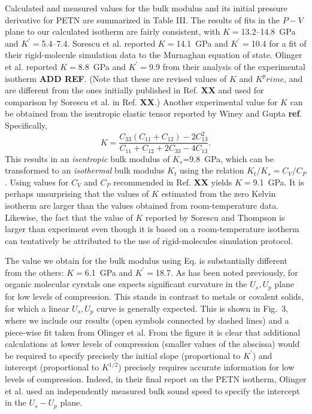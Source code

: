 \documentclass[prb,aps,nobibnotes,twocolumn,doublespace,twocolumngrid,superbib]{revtex4}
\begin{document}
Calculated and measured values for the bulk modulus and its initial
pressure derivative for PETN are summarized in Table III.  The results
of fits in the $P-V$ plane to our calculated isotherm are fairly 
consistent, with $K=$13.2--14.8~GPa and $K^\prime=$5.4--7.4.  Sorescu
et al. reported $K=$14.1~GPa and $K^\prime=$10.4 for a fit of their
rigid-molecule simulation data to the Murnaghan equation of state. 
Olinger et al. reported $K=$8.8~GPa and $K^\prime=$9.9 from their
analysis of the experimental isotherm {\bf ADD REF}.  (Note that these
are revised values of $K$ and $K^prime$, and are different from the 
ones initially published in Ref. {\bf XX} and used for comparison by 
Sorescu et al. in Ref. {\bf XX}.)  Another experimental value for $K$
can be obtained from the isentropic elastic tensor reported by Winey and 
Gupta {\bf ref}.  Specifically, 
\begin{equation}
K=\frac{C_{33}(C_{11}+C_{12})-2C_{13}^2}{C_{11}+C_{12}+2C_{33}-4C_{13}}.
\end{equation}
This results in an {\em isentropic} bulk modulus of $K_s$=9.8~GPa, which can 
be transformed to an {\em isothermal} bulk modulus $K_t$ using the relation 
$K_t/K_s=C_V/C_P$.  Using values for $C_V$ and $C_P$ recommended in Ref. 
{\bf XX} yields $K=$9.1~GPa. It is perhaps unsurprising that the values
of $K$ estimated from the zero Kelvin isotherm are larger than the values
obtained from room-temperature data.  Likewise, the fact that the value
of $K$ reported by Sorescu and Thompson is larger than experiment even
though it is based on a room-temperature isotherm can tentatively be
attributed to the use of rigid-molecules simulation protocol.

The value we obtain for the bulk modulus using Eq. {\bf}  is substantially 
different from the others: $K=$6.1~GPa and $K^\prime=$18.7.  As has been 
noted previously, for organic molecular cyrstals one expects significant 
curvature in the $U_s,U_p$ plane for low levels of compression.  This 
stands in contrast to metals or covalent solids, for which a linear 
$U_s,U_p$ curve is generally expected.  This is shown in Fig.~3, where
we include our results (open symbols connected by dashed lines) and
a piece-wise fit taken from Olinger et al.  From the figure it is
clear that additional calculations at lower levels of compression (smaller
values of the abscissa) would be required to specify precisely the
initial slope (proportional to $K^\prime$) and intercept (proportional 
to $K^{1/2}$) precisely requires accurate information for low levels of 
compression.  Indeed, in their final report on the PETN isotherm, Olinger
et al. used an independently measured bulk sound speed to specify the
intercept in the $U_s-U_p$ plane.
\end{document}
